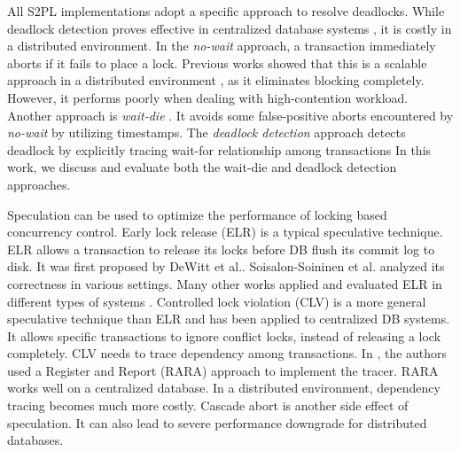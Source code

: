\documentclass[conference]{IEEEtran}
\begin{document}
All S2PL implementations adopt a specific approach to resolve deadlocks.
While deadlock detection proves effective in centralized database systems \cite{MySQL}\cite{PostgreSQL}, it is costly in a distributed environment.
In the \emph{no-wait}
\cite{EvaluationOfCC:journals/pvldb/HardingAPS17}
approach, a transaction immediately aborts if it fails to place a lock.
Previous works showed that this is a scalable approach in a distributed environment \cite{EvaluationCC1000Cores:journals/pvldb/YuBPDS14}\cite{EvaluationOfCC:journals/pvldb/HardingAPS17},
as it eliminates blocking completely.
However, it performs poorly when dealing with high-contention workload.
Another approach is \emph{wait-die} \cite{LockNoWait:journals/csur/BernsteinG81}.
It avoids some false-positive aborts encountered by \emph{no-wait} by utilizing timestamps.
The \emph{deadlock detection} approach \cite{LockCC:conf/ds/GrayLPT76} detects deadlock by explicitly tracing wait-for relationship among transactions
In this work, we discuss and evaluate both the wait-die and deadlock detection approaches.

Speculation can be used to optimize the performance of locking based concurrency control.
Early lock release (ELR)
\cite{EfficientLocking:conf/vldb/KimuraGK12}
\cite{ELR:dewitt_implementation_1984}
\cite{PS2PL:conf/icdt/Soisalon-SoininenY95}
\cite{Aether:journals/pvldb/JohnsonPSAA10}
\cite{Actor-Oriented-DB:conf/icde/Bernstein18}
is a typical speculative technique.
ELR allows a transaction to release its locks before DB flush its commit log to disk.
It was first proposed by DeWitt et al.\cite{ELR:dewitt_implementation_1984}.
Soisalon-Soininen et al. \cite{PS2PL:conf/icdt/Soisalon-SoininenY95} analyzed its correctness in various settings.
Many other works applied and evaluated ELR in different types of systems
\cite{EfficientLocking:conf/vldb/KimuraGK12}
\cite{Aether:journals/pvldb/JohnsonPSAA10}.
Controlled lock violation (CLV) \cite{CLV:conf/sigmod/GraefeLKTV13} is a more general speculative technique than ELR and has been applied to centralized DB systems.
It allows specific transactions to ignore conflict locks, instead of releasing a lock completely.
CLV needs to trace dependency among transactions.
In \cite{CLV:conf/sigmod/GraefeLKTV13}, the authors used a Register and Report (RARA) approach \cite{HeckatonMVCC:journals/pvldb/LarsonBDFPZ11} to implement the tracer.
RARA works well on a centralized database. In a distributed environment, dependency tracing becomes much more costly.
Cascade abort is another side effect of speculation. It can also lead to severe performance downgrade for distributed databases.
\end{document}
